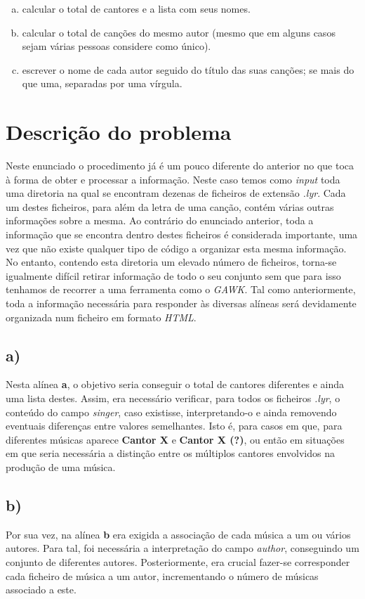 \documentclass[12pt,a4paper]{report}
\begin{document}
\begin{enumerate}[a)]
    \item calcular o total de cantores e a lista com seus nomes.
    \item calcular o total de canções do mesmo autor (mesmo que em alguns casos sejam várias pessoas considere como único).
    \item escrever o nome de cada autor seguido do título das suas canções; se mais do que uma, separadas por uma vírgula.
\end{enumerate}

\section{Descrição do problema}
Neste enunciado o procedimento já é um pouco diferente do anterior no que toca à forma de obter e processar a informação. Neste caso temos como \emph{input} toda uma diretoria na qual se encontram dezenas de ficheiros de extensão \emph{.lyr}. Cada um destes ficheiros, para além da letra de uma canção, contém várias outras informações sobre a mesma. Ao contrário do enunciado anterior, toda a informação que se encontra dentro destes ficheiros é considerada importante, uma vez que não existe qualquer tipo de código a organizar esta mesma informação. No entanto, contendo esta diretoria um elevado número de ficheiros, torna-se igualmente difícil retirar informação de todo o seu conjunto sem que para isso tenhamos de recorrer a uma ferramenta como o \emph{GAWK}. Tal como anteriormente, toda a informação necessária para responder às diversas alíneas será devidamente organizada num ficheiro em formato \emph{HTML}.

\subsection{a)}
Nesta alínea \textbf{a}, o objetivo seria conseguir o total de cantores diferentes e ainda uma lista destes. Assim, era necessário verificar, para todos os ficheiros \emph{.lyr}, o conteúdo do campo \emph{singer}, caso existisse, interpretando-o e ainda removendo eventuais diferenças entre valores semelhantes. Isto é, para casos em que, para diferentes músicas aparece \textbf{Cantor X} e \textbf{Cantor X (?)}, ou então em situações em que seria necessária a distinção entre os múltiplos cantores envolvidos na produção de uma música.

\subsection{b)}
Por sua vez, na alínea \textbf{b} era exigida a associação de cada música a um ou vários autores. Para tal, foi necessária a interpretação do campo \emph{author}, conseguindo um conjunto de diferentes autores. Posteriormente, era crucial fazer-se corresponder cada ficheiro de música a um autor, incrementando o número de músicas associado a este.
\end{document}
